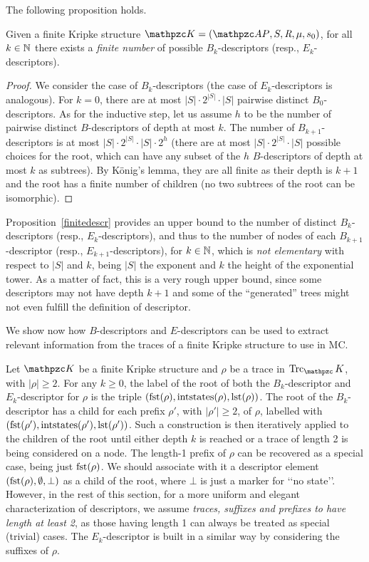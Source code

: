 The following proposition holds.
%
\begin{proposition}\label{finitedescr}
Given a finite Kripke structure $\Ku=\KuDef$, for all $k\in\mathbb{N}$ there exists a \emph{finite number} of possible $B_k$-descriptors (resp., $E_k$-descriptors).
\end{proposition}
\begin{proof}
We consider the case of $B_k$-descriptors (the case of $E_k$-descriptors is analogous).
For $k=0$, there are at most $|S|\cdot 2^{|S|} \cdot |S|$ pairwise distinct $B_0$-descriptors. 
As for the inductive step, let us assume $h$ to be the number of pairwise distinct $B$-descriptors of depth at most $k$. The number of $B_{k+1}$-descriptors is at most $|S| \cdot 2^{|S|}\cdot |S| \cdot 2^h$ (there are at most $|S|\cdot 2^{|S|}\cdot |S|$ possible choices for the root, which can have any subset of the $h$ $B$-descriptors of depth at most $k$ as subtrees). By K\"onig's lemma, they are all finite as their depth is $k+1$ and the root has a finite number of children (no two subtrees of the root can be isomorphic).
\end{proof}

Proposition~\ref{finitedescr} provides an upper bound to the number of distinct $B_k$-descriptors (resp., $E_k$-descriptors), and thus to the number of nodes of each $B_{k+1}$-descriptor (resp., $E_{k+1}$-descriptors), for $k\in\mathbb{N}$, which is \emph{not elementary} with respect to $|S|$ and $k$, being $|S|$ the exponent and $k$ the height of the exponential tower. As a matter of fact, this is a very rough upper bound, since some descriptors may not have depth $k+1$ and some of the ``generated'' trees might not even fulfill the definition of descriptor.

We show now how $B$-descriptors and $E$-descriptors can be used to extract relevant information from the traces of a finite Kripke structure to use in MC. 

Let $\Ku$ be a finite Kripke structure and $\rho$ be a trace in $\Trk_\Ku$, with $|\rho|\geq 2$.
For any $k \geq 0$, the label of the root of both the $B_k$-descriptor and $E_k$-descriptor for
$\rho$ is the triple $(\operatorname{fst}(\rho),\operatorname{intstates}(\rho),\operatorname{lst}(\rho))$. The root of the $B_k$-descriptor has a child for each prefix $\rho'$, with $|\rho'|\geq 2$, of $\rho$, labelled with $(\operatorname{fst}(\rho'),\operatorname{intstates}(\rho'),\operatorname{lst}(\rho'))$.
Such a construction is then iteratively applied to the children of the root until either depth $k$ is reached or a trace of length 2 is being considered on a node. 
The length-1 prefix of $\rho$ can be recovered as a special case, being just $\operatorname{fst}(\rho)$. We should associate with it a descriptor element $(\operatorname{fst}(\rho),\emptyset,\bot)$ as a child of the root, where $\bot$ is just a marker for \lq\lq no state\rq\rq. However, in the rest of this section, for a more uniform and elegant characterization of descriptors, we assume \emph{traces, suffixes and prefixes to have length at least 2}, as those having length 1 can always be treated as special (trivial) cases.
%
The $E_k$-descriptor is built in a similar way by considering the suffixes of $\rho$.

